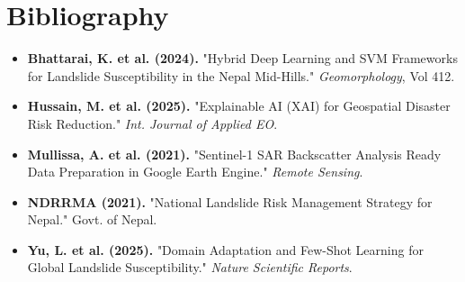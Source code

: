\documentclass[12pt,a4paper]{article}
\begin{document}
\section{Bibliography}
\begin{itemize}[leftmargin=0.15in]
    \item \textbf{Bhattarai, K. et al. (2024).} "Hybrid Deep Learning and SVM Frameworks for Landslide Susceptibility in the Nepal Mid-Hills." \textit{Geomorphology}, Vol 412.
    \item \textbf{Hussain, M. et al. (2025).} "Explainable AI (XAI) for Geospatial Disaster Risk Reduction." \textit{Int. Journal of Applied EO}.
    \item \textbf{Mullissa, A. et al. (2021).} "Sentinel-1 SAR Backscatter Analysis Ready Data Preparation in Google Earth Engine." \textit{Remote Sensing}.
    \item \textbf{NDRRMA (2021).} "National Landslide Risk Management Strategy for Nepal." Govt. of Nepal.
    \item \textbf{Yu, L. et al. (2025).} "Domain Adaptation and Few-Shot Learning for Global Landslide Susceptibility." \textit{Nature Scientific Reports}.
\end{itemize}
\end{document}
